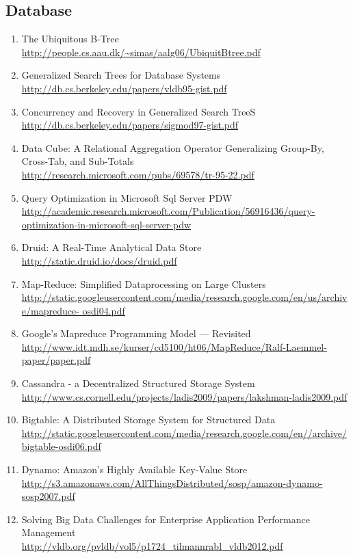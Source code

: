 \documentclass{article}
\begin{document}
\subsection{Database}
\begin{enumerate}
	\item {The Ubiquitous B-Tree\\
\url{http://people.cs.aau.dk/~simas/aalg06/UbiquitBtree.pdf}}
	\item {Generalized Search Trees for Database Systems\\
\url{http://db.cs.berkeley.edu/papers/vldb95-gist.pdf}}
	\item {Concurrency and Recovery in Generalized Search TreeS\\
\url{http://db.cs.berkeley.edu/papers/sigmod97-gist.pdf}}
	\item {Data Cube: A Relational Aggregation Operator Generalizing Group-By, Cross-Tab, and Sub-Totals\\
\url{http://research.microsoft.com/pubs/69578/tr-95-22.pdf}}
	\item {Query Optimization in Microsoft Sql Server PDW\\
\href{http://academic.research.microsoft.com/Publication/56916436/query-optimization-in-microsoft-sql-server-pdw}{http://academic.research.microsoft.com/Publication/56916436/query-optimization-in-microsoft-sql-server-pdw}}
	\item {Druid: A Real-Time Analytical Data Store
\url{http://static.druid.io/docs/druid.pdf}}
	\item {Map-Reduce: Simplified Dataprocessing on Large Clusters\\
\url{http://static.googleusercontent.com/media/research.google.com/en/us/archive/mapreduce-
	osdi04.pdf}}
	\item {Google’s Mapreduce Programming Model — Revisited\\
\url{http://www.idt.mdh.se/kurser/cd5100/ht06/MapReduce/Ralf-Laemmel-paper/paper.pdf}}
	\item {Cassandra - a Decentralized Structured Storage System\\
\url{http://www.cs.cornell.edu/projects/ladis2009/papers/lakshman-ladis2009.pdf}}
	\item {Bigtable: A Distributed Storage System for Structured Data\\
\url{http://static.googleusercontent.com/media/research.google.com/en//archive/bigtable-osdi06.pdf}}
	\item {Dynamo: Amazon’s Highly Available Key-Value Store\\
\url{http://s3.amazonaws.com/AllThingsDistributed/sosp/amazon-dynamo-sosp2007.pdf}}
	\item {Solving Big Data Challenges for Enterprise Application Performance Management\\
\url{http://vldb.org/pvldb/vol5/p1724_tilmannrabl_vldb2012.pdf}}
\end{enumerate}
\end{document}
